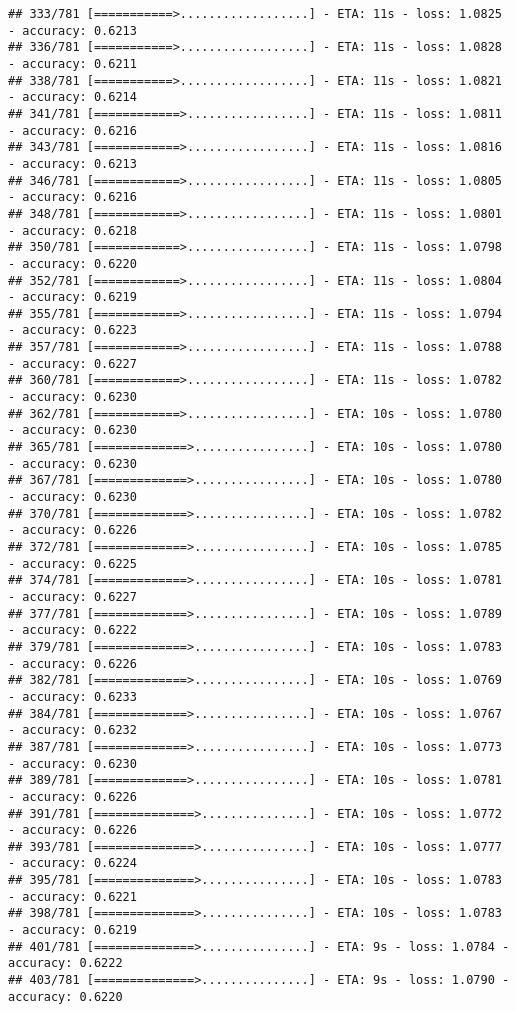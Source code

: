\documentclass[
]{article}
\begin{document}
\begin{verbatim}
## 333/781 [===========>..................] - ETA: 11s - loss: 1.0825 - accuracy: 0.6213
## 336/781 [===========>..................] - ETA: 11s - loss: 1.0828 - accuracy: 0.6211
## 338/781 [===========>..................] - ETA: 11s - loss: 1.0821 - accuracy: 0.6214
## 341/781 [============>.................] - ETA: 11s - loss: 1.0811 - accuracy: 0.6216
## 343/781 [============>.................] - ETA: 11s - loss: 1.0816 - accuracy: 0.6213
## 346/781 [============>.................] - ETA: 11s - loss: 1.0805 - accuracy: 0.6216
## 348/781 [============>.................] - ETA: 11s - loss: 1.0801 - accuracy: 0.6218
## 350/781 [============>.................] - ETA: 11s - loss: 1.0798 - accuracy: 0.6220
## 352/781 [============>.................] - ETA: 11s - loss: 1.0804 - accuracy: 0.6219
## 355/781 [============>.................] - ETA: 11s - loss: 1.0794 - accuracy: 0.6223
## 357/781 [============>.................] - ETA: 11s - loss: 1.0788 - accuracy: 0.6227
## 360/781 [============>.................] - ETA: 11s - loss: 1.0782 - accuracy: 0.6230
## 362/781 [============>.................] - ETA: 10s - loss: 1.0780 - accuracy: 0.6230
## 365/781 [=============>................] - ETA: 10s - loss: 1.0780 - accuracy: 0.6230
## 367/781 [=============>................] - ETA: 10s - loss: 1.0780 - accuracy: 0.6230
## 370/781 [=============>................] - ETA: 10s - loss: 1.0782 - accuracy: 0.6226
## 372/781 [=============>................] - ETA: 10s - loss: 1.0785 - accuracy: 0.6225
## 374/781 [=============>................] - ETA: 10s - loss: 1.0781 - accuracy: 0.6227
## 377/781 [=============>................] - ETA: 10s - loss: 1.0789 - accuracy: 0.6222
## 379/781 [=============>................] - ETA: 10s - loss: 1.0783 - accuracy: 0.6226
## 382/781 [=============>................] - ETA: 10s - loss: 1.0769 - accuracy: 0.6233
## 384/781 [=============>................] - ETA: 10s - loss: 1.0767 - accuracy: 0.6232
## 387/781 [=============>................] - ETA: 10s - loss: 1.0773 - accuracy: 0.6230
## 389/781 [=============>................] - ETA: 10s - loss: 1.0781 - accuracy: 0.6226
## 391/781 [==============>...............] - ETA: 10s - loss: 1.0772 - accuracy: 0.6226
## 393/781 [==============>...............] - ETA: 10s - loss: 1.0777 - accuracy: 0.6224
## 395/781 [==============>...............] - ETA: 10s - loss: 1.0783 - accuracy: 0.6221
## 398/781 [==============>...............] - ETA: 10s - loss: 1.0783 - accuracy: 0.6219
## 401/781 [==============>...............] - ETA: 9s - loss: 1.0784 - accuracy: 0.6222 
## 403/781 [==============>...............] - ETA: 9s - loss: 1.0790 - accuracy: 0.6220

\end{verbatim}
\end{document}
